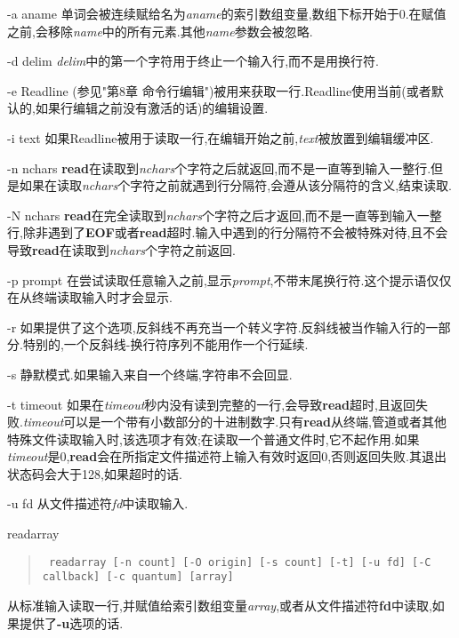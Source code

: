 \documentclass[draft,openany]{book}
\begin{document}
\begin{CJK}{UTF8}{gbsn}
\begin{basedescript}{\desclabelstyle{\nextlinelabel}\desclabelwidth{2.5em}}
\begin{basedescript}{\desclabelstyle{\nextlinelabel}\desclabelwidth{2.5em}}
        \item[-a aname] 单词会被连续赋给名为\emph{aname}的索引数组变量,数组下标开始于0.在赋值之前,会移除\emph{name}中的所有元素.其他\emph{name}参数会被忽略.
        \item[-d delim] \emph{delim}中的第一个字符用于终止一个输入行,而不是用换行符.
        \item[-e] Readline (参见"第8章 命令行编辑")被用来获取一行.Readline使用当前(或者默认的,如果行编辑之前没有激活的话)的编辑设置.
        \item[-i text] 如果Readline被用于读取一行,在编辑开始之前,\emph{text}被放置到编辑缓冲区.
        \item[-n nchars] \textbf{read}在读取到\emph{nchars}个字符之后就返回,而不是一直等到输入一整行.但是如果在读取\emph{nchars}个字符之前就遇到行分隔符,会遵从该分隔符的含义,结束读取.
        \item[-N nchars] \textbf{read}在完全读取到\emph{nchars}个字符之后才返回,而不是一直等到输入一整行,除非遇到了\textbf{EOF}或者\textbf{read}超时.输入中遇到的行分隔符不会被特殊对待,且不会导致\textbf{read}在读取到\emph{nchars}个字符之前返回.
        \item[-p prompt] 在尝试读取任意输入之前,显示\emph{prompt},不带末尾换行符.这个提示语仅仅在从终端读取输入时才会显示.
        \item[-r] 如果提供了这个选项,反斜线不再充当一个转义字符.反斜线被当作输入行的一部分.特别的,一个反斜线-换行符序列不能用作一个行延续.
        \item[-s] 静默模式.如果输入来自一个终端,字符串不会回显.
        \item[-t timeout] 如果在\emph{timeout}秒内没有读到完整的一行,会导致\textbf{read}超时,且返回失败.\emph{timeout}可以是一个带有小数部分的十进制数字.只有\textbf{read}从终端,管道或者其他特殊文件读取输入时,该选项才有效;在读取一个普通文件时,它不起作用.如果\emph{timeout}是0,\textbf{read}会在所指定文件描述符上输入有效时返回0,否则返回失败.其退出状态码会大于128,如果超时的话.
        \item[-u fd] 从文件描述符\emph{fd}中读取输入.
        \end{basedescript}
    \item[readarray]
        \begin{quote}
            \verb+ readarray [-n count] [-O origin] [-s count] [-t] [-u fd] [-C callback] [-c quantum] [array]+
        \end{quote}
        从标准输入读取一行,并赋值给索引数组变量\emph{array},或者从文件描述符\textbf{fd}中读取,如果提供了\textbf{-u}选项的话.\par

\end{basedescript}
\end{CJK}
\end{document}
